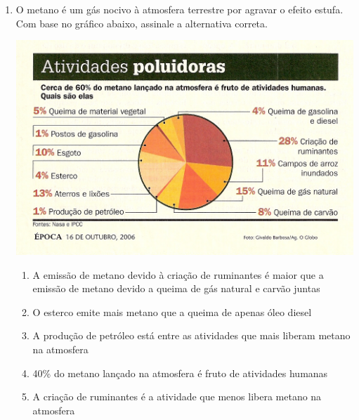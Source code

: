 \documentclass[10pt,a4paper]{article}
\newenvironment{Figure}
  {\par\medskip\noindent\minipage{\linewidth}}
  {\endminipage\par\medskip}
\begin{document}
\begin{multicols}{2}
\begin{enumerate}
	Em rela\c{c}\~ao a esse composto, \'e incorreto afirmar: 

		\begin{enumerate}
		\item a f\'ormula molecular \'e $C_{18}H_{29}N$ 
		\item o n\'umero de \'atomos de carbono (C) prim\'ario (ligado somente a outro C), secund\'ario (ligado a outros dois C) e terci\'ario (ligado a tr\^es C) \'e, respectivamente, 2, 12 e 4.
		\item o n\'umero de \'atomos de carbono com hibridiza\c{c}\~ao $sp^3$, $sp^2$ e $sp$ \'e, respectivamente, 15, 2 e 1.
		\item o n\'umero de liga\c{c}\~oes pi ($\pi$) \'e igual a 3 
		\item apenas os \'atomos de carbono terci\'arios possuem geometria tetra\'edrica 
		\end{enumerate}




	\item O metano \'e um g\'as nocivo \`a atmosfera terrestre por agravar o efeito estufa. Com base no gr\'afico abaixo, assinale a alternativa correta.

\begin{Figure}
     \includegraphics[scale=0.235]{ozonio.jpg}
\end{Figure}

		\begin{enumerate}
		\item A emiss\~ao de metano devido \`a cria\c{c}\~ao de ruminantes \'e maior que a emiss\~ao de metano devido a queima de g\'as natural e carv\~ao juntas
		\item O esterco emite mais metano que a queima de apenas \'oleo diesel
		\item A produ\c{c}\~ao de petr\'oleo est\'a entre as atividades que mais liberam metano na atmosfera
		\item 40\% do metano lan\c{c}ado na atmosfera \'e fruto de atividades humanas
		\item A cria\c{c}\~ao de ruminantes \'e a atividade que menos libera metano na atmosfera
		\end{enumerate}


\end{enumerate}
\end{multicols}
\end{document}

